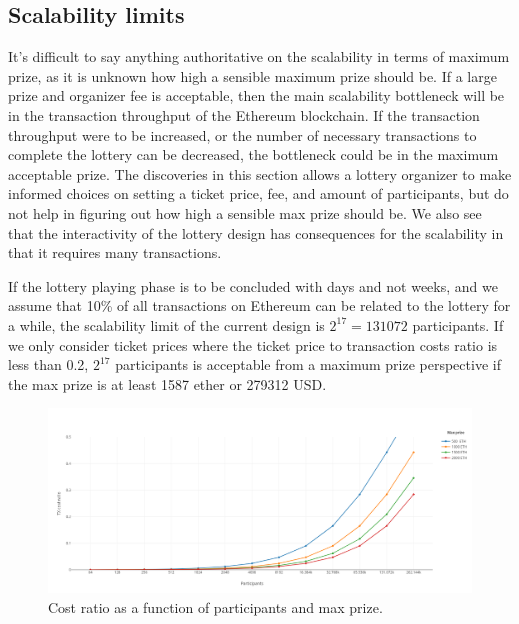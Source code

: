 \subsection{Scalability limits}

It's difficult to say anything authoritative on the scalability in terms of maximum prize, as it is unknown how high a sensible maximum prize should be. If a large prize and organizer fee is acceptable, then the main scalability bottleneck will be in the transaction throughput of the Ethereum blockchain. If the transaction throughput were to be increased, or the number of necessary transactions to complete the lottery can be decreased, the bottleneck could be in the maximum acceptable prize. The discoveries in this section allows a lottery organizer to make informed choices on setting a ticket price, fee, and amount of participants, but do not help in figuring out how high a sensible max prize should be. We also see that the interactivity of the lottery design has consequences for the scalability in that it requires many transactions.

If the lottery playing phase is to be concluded with days and not weeks, and we assume that 10\% of all transactions on Ethereum can be related to the lottery for a while, the scalability limit of the current design is $2^{17}=131072$ participants. If we only consider ticket prices where the ticket price to transaction costs ratio is less than 0.2, $2^{17}$ participants is acceptable from a maximum prize perspective if the max prize is at least 1587 ether or 279312 USD. 

\begin{figure}[htbp]
  \centering
  \includegraphics[width=\columnwidth]{figures/max_participants_cost_ratio.png}
  \caption{Cost ratio as a function of participants and max prize.}
  \label{fig:cost-ratio-chart}
\end{figure}

